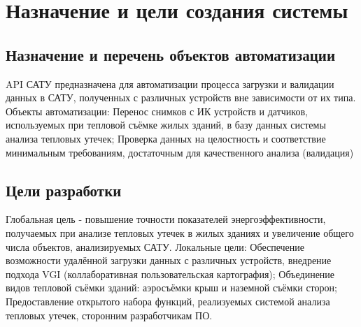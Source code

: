 \chapter{Назначение и цели создания системы}

\section{Назначение и перечень объектов автоматизации}
	API САТУ предназначена для автоматизации процесса загрузки и валидации данных в САТУ, полученных с различных устройств вне зависимости от их типа.
	Объекты автоматизации: 
	Перенос снимков с ИК устройств и датчиков, используемых при тепловой съёмке жилых зданий, в базу данных системы анализа тепловых утечек;
	Проверка данных на целостность и соответствие минимальным требованиям, достаточным для качественного анализа (валидация)

\section{Цели разработки}
	Глобальная цель - повышение точности показателей энергоэффективности, получаемых при анализе тепловых утечек в жилых зданиях и увеличение общего числа объектов, анализируемых САТУ.
	Локальные цели:
Обеспечение возможности удалённой загрузки данных с различных устройств, внедрение подхода VGI (коллаборативная пользовательская картография);
Объединение видов тепловой съёмки зданий: аэросъёмки крыш и наземной съёмки сторон;
Предоставление открытого набора функций, реализуемых системой анализа тепловых утечек, сторонним разработчикам ПО.